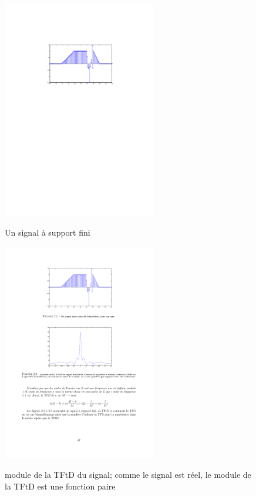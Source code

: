\begin{definition}
\begin{figure}
  \centering
  \includegraphics[width=0.6\textwidth]{Figures/Figure2-1}\\
  \caption{Un signal  \`a support fini}\label{fig:figure2-1}
\end{figure}

\begin{figure}
  \centering
  \includegraphics[width=0.6\textwidth]{Figures/Figure2-2}\\
  \caption{module de la TFtD du signal; comme le signal est r\'eel, le module de la TFtD est une fonction paire}\label{fig:figure2-2}
\end{figure}


\end{definition}
